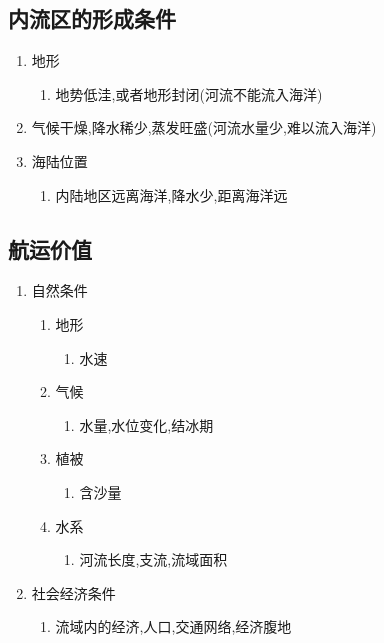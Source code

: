 \documentclass[a4paper]{article}
\begin{document}
    \subsection{内流区的形成条件}
    \begin{enumerate}
        \item 地形
            \begin{enumerate}
                \item 地势低洼,或者地形封闭(河流不能流入海洋)
            \end{enumerate}
        \item 气候干燥,降水稀少,蒸发旺盛(河流水量少,难以流入海洋) %
        \item 海陆位置
            \begin{enumerate}
                \item 内陆地区远离海洋,降水少,距离海洋远
            \end{enumerate}
    \end{enumerate}
    \subsection{航运价值}
    \begin{enumerate}
        \item 自然条件
        \begin{enumerate}
            \item 地形
            \begin{enumerate}
                \item 水速
            \end{enumerate}
            \item 气候
            \begin{enumerate}
                \item 水量,水位变化,结冰期
            \end{enumerate}
            \item 植被
            \begin{enumerate}
                \item 含沙量
            \end{enumerate}
            \item 水系
            \begin{enumerate}
                \item 河流长度,支流,流域面积
            \end{enumerate}
        \end{enumerate}
        \item 社会经济条件
        \begin{enumerate}
            \item 流域内的经济,人口,交通网络,经济腹地
        \end{enumerate}
    \end{enumerate}
\end{document}
